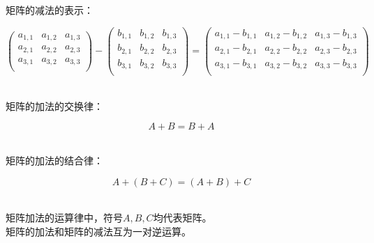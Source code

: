 \documentclass[UTF8]{ctexart}
\begin{document}
    矩阵的减法的表示：\vspace{5pt}
    \begin{large}
        \begin{equation*}     
            \begin{pmatrix}
                a_{1,1}&a_{1,2}&a_{1,3}\\
                a_{2,1}&a_{2,2}&a_{2,3}\\
                a_{3,1}&a_{3,2}&a_{3,3}\\
            \end{pmatrix}
            -
            \begin{pmatrix}
                b_{1,1}&b_{1,2}&b_{1,3}\\
                b_{2,1}&b_{2,2}&b_{2,3}\\
                b_{3,1}&b_{3,2}&b_{3,3}\\
            \end{pmatrix}
            =
            \begin{pmatrix}
                a_{1,1}-b_{1,1}&a_{1,2}-b_{1,2}&a_{1,3}-b_{1,3}\\
                a_{2,1}-b_{2,1}&a_{2,2}-b_{2,2}&a_{2,3}-b_{2,3}\\
                a_{3,1}-b_{3,1}&a_{3,2}-b_{3,2}&a_{3,3}-b_{3,3}\\
            \end{pmatrix}
        \end{equation*}
    \end{large}\\[5mm]
    矩阵的加法的交换律：
    \begin{large}
        \begin{equation*}
            A+B=B+A
        \end{equation*}
    \end{large}\\
    矩阵的加法的结合律：
    \begin{large}
        \begin{equation*}
            A+(B+C)=(A+B)+C
        \end{equation*}
    \end{large}\\
    矩阵加法的运算律中，符号$A,B,C$均代表矩阵。\\[3mm]
    矩阵的加法和矩阵的减法互为一对逆运算。

\newpage
\end{document}
